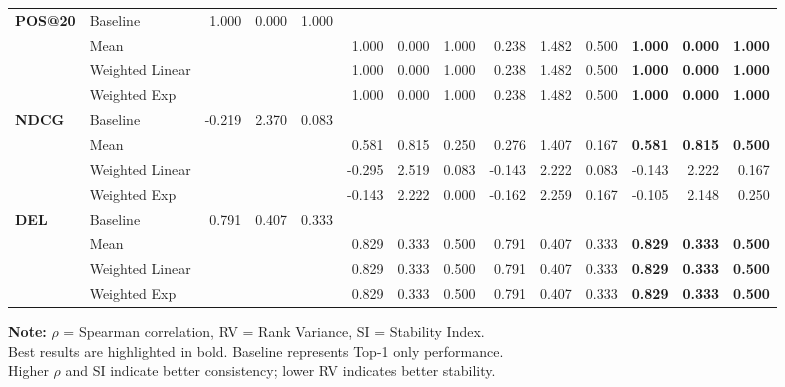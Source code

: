 \documentclass{article}
\begin{document}
\begin{table}[htbp]
\begin{tabular}{@{}llrrr|rrr|rrr|rrr@{}}
\multirow{4}{*}{\textbf{POS@20}} 
& Baseline & 1.000 & 0.000 & 1.000 & & & & & & & & & \\
& Mean & & & & 1.000 & 0.000 & 1.000 & 0.238 & 1.482 & 0.500 & \textbf{1.000} & \textbf{0.000} & \textbf{1.000} \\
& Weighted Linear & & & & 1.000 & 0.000 & 1.000 & 0.238 & 1.482 & 0.500 & \textbf{1.000} & \textbf{0.000} & \textbf{1.000} \\
& Weighted Exp & & & & 1.000 & 0.000 & 1.000 & 0.238 & 1.482 & 0.500 & \textbf{1.000} & \textbf{0.000} & \textbf{1.000} \\
\midrule

\multirow{4}{*}{\textbf{NDCG}} 
& Baseline & -0.219 & 2.370 & 0.083 & & & & & & & & & \\
& Mean & & & & 0.581 & 0.815 & 0.250 & 0.276 & 1.407 & 0.167 & \textbf{0.581} & \textbf{0.815} & \textbf{0.500} \\
& Weighted Linear & & & & -0.295 & 2.519 & 0.083 & -0.143 & 2.222 & 0.083 & -0.143 & 2.222 & 0.167 \\
& Weighted Exp & & & & -0.143 & 2.222 & 0.000 & -0.162 & 2.259 & 0.167 & -0.105 & 2.148 & 0.250 \\
\midrule

\multirow{4}{*}{\textbf{DEL}} 
& Baseline & 0.791 & 0.407 & 0.333 & & & & & & & & & \\
& Mean & & & & 0.829 & 0.333 & 0.500 & 0.791 & 0.407 & 0.333 & \textbf{0.829} & \textbf{0.333} & \textbf{0.500} \\
& Weighted Linear & & & & 0.829 & 0.333 & 0.500 & 0.791 & 0.407 & 0.333 & \textbf{0.829} & \textbf{0.333} & \textbf{0.500} \\
& Weighted Exp & & & & 0.829 & 0.333 & 0.500 & 0.791 & 0.407 & 0.333 & \textbf{0.829} & \textbf{0.333} & \textbf{0.500} \\

\bottomrule
\end{tabular}
\begin{flushleft}
\textbf{Note:} $\rho$ = Spearman correlation, RV = Rank Variance, SI = Stability Index. \\
Best results are highlighted in bold. Baseline represents Top-1 only performance. \\
Higher $\rho$ and SI indicate better consistency; lower RV indicates better stability.
\end{flushleft}
\end{table}
\end{document}
